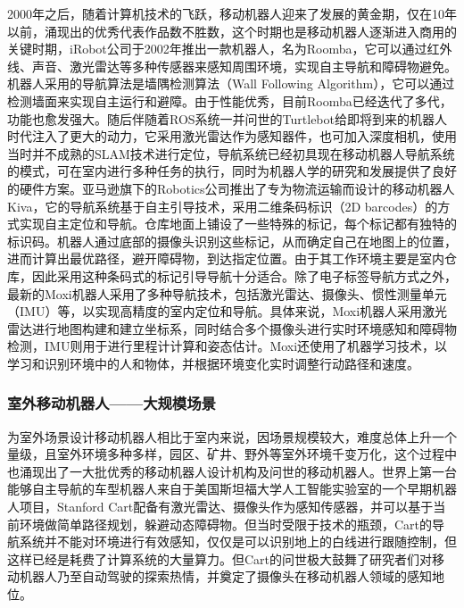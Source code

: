 2000年之后，随着计算机技术的飞跃，移动机器人迎来了发展的黄金期，仅在10年以前，涌现出的优秀代表作品数不胜数，这个时期也是移动机器人逐渐进入商用的关键时期，iRobot公司于2002年推出一款机器人，名为Roomba\cite{jones2006robots}，它可以通过红外线、声音、激光雷达等多种传感器来感知周围环境，实现自主导航和障碍物避免。机器人采用的导航算法是墙隅检测算法（Wall Following Algorithm），它可以通过检测墙面来实现自主运行和避障。由于性能优秀，目前Roomba已经迭代了多代，功能也愈发强大。随后伴随着ROS系统一并问世的Turtlebot\cite{quigley2009ros}给即将到来的机器人时代注入了更大的动力，它采用激光雷达作为感知器件，也可加入深度相机，使用当时并不成熟的SLAM技术进行定位，导航系统已经初具现在移动机器人导航系统的模式，可在室内进行多种任务的执行，同时为机器人学的研究和发展提供了良好的硬件方案。亚马逊旗下的Robotics公司推出了专为物流运输而设计的移动机器人Kiva\cite{weidinger2018storage}，它的导航系统基于自主引导技术，采用二维条码标识（2D barcodes）的方式实现自主定位和导航。仓库地面上铺设了一些特殊的标记，每个标记都有独特的标识码。机器人通过底部的摄像头识别这些标记，从而确定自己在地图上的位置，进而计算出最优路径，避开障碍物，到达指定位置。由于其工作环境主要是室内仓库，因此采用这种条码式的标记引导导航十分适合。除了电子标签导航方式之外，最新的Moxi\cite{hurst2020social}机器人采用了多种导航技术，包括激光雷达、摄像头、惯性测量单元（IMU）等，以实现高精度的室内定位和导航。具体来说，Moxi机器人采用激光雷达进行地图构建和建立坐标系，同时结合多个摄像头进行实时环境感知和障碍物检测，IMU则用于进行里程计计算和姿态估计。Moxi还使用了机器学习技术，以学习和识别环境中的人和物体，并根据环境变化实时调整行动路径和速度。

\subsubsection{室外移动机器人——大规模场景}
为室外场景设计移动机器人相比于室内来说，因场景规模较大，难度总体上升一个量级，且室外环境多种多样，园区、矿井、野外等室外环境千变万化，这个过程中也涌现出了一大批优秀的移动机器人设计机构及问世的移动机器人。世界上第一台能够自主导航的车型机器人来自于美国斯坦福大学人工智能实验室的一个早期机器人项目，Stanford Cart\cite{moravec1983stanford}配备有激光雷达、摄像头作为感知传感器，并可以基于当前环境做简单路径规划，躲避动态障碍物。但当时受限于技术的瓶颈，Cart的导航系统并不能对环境进行有效感知，仅仅是可以识别地上的白线进行跟随控制，但这样已经是耗费了计算系统的大量算力。但Cart的问世极大鼓舞了研究者们对移动机器人乃至自动驾驶的探索热情，并奠定了摄像头在移动机器人领域的感知地位。

